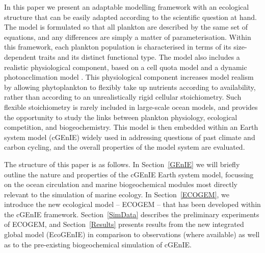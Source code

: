 \documentclass[gmd, manuscript]{copernicus}
\begin{document}
In this paper we present an adaptable modelling framework with an ecological structure that can be easily adapted according to the scientific question at hand. The model is formulated so that all plankton are described by the same set of equations, and any differences are simply a matter of parameterisation. Within this framework, each plankton population is characterised in terms of its size-dependent traits and its distinct functional type. The model also includes a realistic physiological component, based on a cell quota model \citep{Caperon:1968,Droop:1968} and a dynamic photoacclimation model \citep{Geider:1998}. This physiological component increases model realism by allowing phytoplankton to flexibly take up nutrients according to availability, rather than according to an unrealistically rigid cellular stoichiometry. Such flexible stoichiometry is rarely included in large-scale ocean models, and provides the opportunity to study the links between plankton physiology, ecological competition, and biogeochemistry. This model is then embedded within an Earth system model (cGEnIE) widely used in addressing questions of past climate and carbon cycling, and the overall properties of the model system are evaluated. 

The structure of this paper is as follows. In Section~\ref{GEnIE} we will briefly outline the nature and properties of the cGEnIE Earth system model, focussing on the ocean circulation and marine biogeochemical modules most directly relevant to the simulation of marine ecology. In Section~\ref{ECOGEM}, we  introduce the new ecological model -- ECOGEM -- that has been developed within the cGEnIE framework. Section~\ref{SimData} describes the preliminary  experiments of ECOGEM, and Section~\ref{Results} presents results from the new  integrated global model (EcoGEnIE)  in comparison to observations (where available) as well as to the pre-existing biogeochemical simulation of cGEnIE.


%
\end{document}
